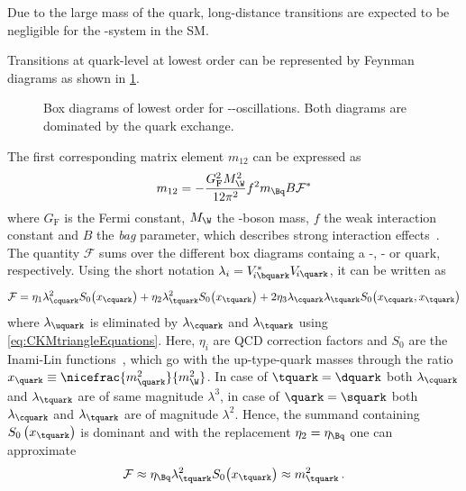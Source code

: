 Due to the large mass of the \bquark quark, long-distance transitions are expected to be negligible for the \Bq-\Bqb system in the \ac{SM}.

Transitions at quark-level at lowest order can be represented by Feynman diagrams as shown in \cref{fig:FeynmanMixing}.
\begin{figure}[tbp]
	\centering
	
	\hspace{0.5cm}
	
	\caption{Box diagrams of lowest order for \Bq-\Bqb-oscillations. Both diagrams are dominated by the \tquark quark exchange\cite{Ellis:2016jkw}.}
	\label{fig:FeynmanMixing}
\end{figure}
The first corresponding matrix element $m_{12}$ can be expressed as
\begin{equation}
m_{12}=-\frac{G_{\text{F}}^2M_\W^2}{12\pi^2}f^2m_{\Bq}B\mathcal{F}^\ast \label{eq:monetwo}
\end{equation}
where $G_{\text{F}}$ is the Fermi constant, $M_\W$ the \W-boson mass, $f$ the weak interaction constant and $B$ the \emph{bag} parameter, which describes strong interaction effects~\cite{Branco:396964}.
The quantity $\mathcal{F}$ sums over the different box diagrams containg a \uquark-, \cquark- or \tquark quark, respectively.
Using the short notation $\lambda_i=V^{*}_{{\kern -0.1em}i\bquark}V_{{\kern -0.1em}i\quark}$, it can be written as
\begin{equation}
\mathcal{F}=\eta_1\lambda_\cquark^2S_0\!\left(x_\cquark\right)+\eta_2\lambda_\tquark^2S_0\!\left(x_\tquark\right)
+2\eta_3\lambda_{\cquark}\lambda_{\tquark}S_0\!\left(x_\cquark,x_\tquark\right)
\end{equation}
where $\lambda_\uquark$ is eliminated by $\lambda_\cquark$ and $\lambda_\tquark$ using \cref{eq:CKMtriangleEquations}.
Here, $\eta_i$ are QCD correction factors and $S_0$ are the Inami-Lin functions~\cite{Inami:1980fz}, which go with the up-type-quark masses through the ratio $x_\quark\equiv\nicefrac{m_\quark^2}{m_\W^2}$.
In case of $\tquark=\dquark$ both $\lambda_\cquark$ and $\lambda_\tquark$ are of same magnitude $\lambda^3$, in case of $\quark=\squark$ both $\lambda_\cquark$ and $\lambda_\tquark$ are of magnitude $\lambda^2$.
Hence, the summand containing $S_0\left(x_\tquark\right)$ is dominant and with the replacement $\eta_2=\eta_\Bq$ one can approximate
\begin{equation}
\mathcal{F}\approx\eta_\Bq\lambda_\tquark^2S_0\!\left(x_\tquark\right)\approx m_\tquark^2\,.
\end{equation}

